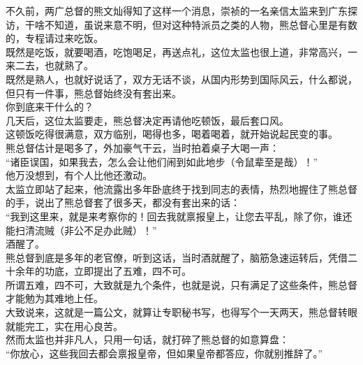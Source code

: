 \begin{multicols}{\theparacolNo}
不久前，两广总督的熊文灿得知了这样一个消息，崇祯的一名亲信太监来到广东探访，干啥不知道，虽说来意不明，但对这种特派员之类的人物，熊总督心里是有数的，专程请过来吃饭。\\

既然是吃饭，就要喝酒，吃饱喝足，再送点礼，这位太监也很上道，非常高兴，一来二去，也就熟了。\\

既然是熟人，也就好说话了，双方无话不谈，从国内形势到国际风云，什么都说，但只有一件事，熊总督始终没有套出来。\\

你到底来干什么的？\\

几天后，这位太监要走，熊总督决定再请他吃顿饭，最后套口风。\\

这顿饭吃得很满意，双方临别，喝得也多，喝着喝着，就开始说起民变的事。\\

熊总督估计是喝多了，外加豪气干云，当时拍着桌子大喝一声：\\

“诸臣误国，如果我去，怎么会让他们闹到如此地步（令鼠辈至是哉）！”\\

他万没想到，有个人比他还激动。\\

太监立即站了起来，他流露出多年卧底终于找到同志的表情，热烈地握住了熊总督的手，说出了熊总督套了很多天，都没有套出来的话：\\

“我到这里来，就是来考察你的！回去我就禀报皇上，让您去平乱，除了你，谁还能扫清流贼（非公不足办此贼）！”\\

酒醒了。\\

熊总督到底是多年的老官僚，听到这话，当时酒就醒了，脑筋急速运转后，凭借二十余年的功底，立即提出了五难，四不可。\\

所谓五难，四不可，大致就是九个条件，也就是说，只有满足了这些条件，熊总督才能勉为其难地上任。\\

大致说来，这就是一篇公文，就算让专职秘书写，也得写个一天两天，熊总督转眼就能完工，实在用心良苦。\\

然而太监也并非凡人，只用一句话，就打碎了熊总督的如意算盘：\\

“你放心，这些我回去都会禀报皇帝，但如果皇帝都答应，你就别推辞了。”\\


\end{multicols}
